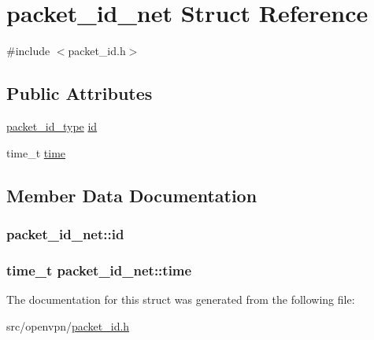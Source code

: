 \hypertarget{structpacket__id__net}{}\section{packet\+\_\+id\+\_\+net Struct Reference}
\label{structpacket__id__net}


{\ttfamily \#include $<$packet\+\_\+id.\+h$>$}

\subsection*{Public Attributes}
\begin{DoxyCompactItemize}
\item 
\hyperlink{packet__id_8h_a345f753b1c6ea20d24409e769aadb7e6}{packet\+\_\+id\+\_\+type} \hyperlink{structpacket__id__net_a300d0c69b0c0fa1c1bc0c83627f30471}{id}
\item 
time\+\_\+t \hyperlink{structpacket__id__net_a29fef93050491e05cb264e4017d85c2d}{time}
\end{DoxyCompactItemize}


\subsection{Member Data Documentation}
\hypertarget{structpacket__id__net_a300d0c69b0c0fa1c1bc0c83627f30471}{}
\subsubsection[{id}]{ packet\+\_\+id\+\_\+net\+::id}\label{structpacket__id__net_a300d0c69b0c0fa1c1bc0c83627f30471}
\hypertarget{structpacket__id__net_a29fef93050491e05cb264e4017d85c2d}{}
\subsubsection[{time}]{\setlength{\rightskip}{0pt plus 5cm}time\+\_\+t packet\+\_\+id\+\_\+net\+::time}\label{structpacket__id__net_a29fef93050491e05cb264e4017d85c2d}


The documentation for this struct was generated from the following file\+:\begin{DoxyCompactItemize}
\item 
src/openvpn/\hyperlink{packet__id_8h}{packet\+\_\+id.\+h}\end{DoxyCompactItemize}
